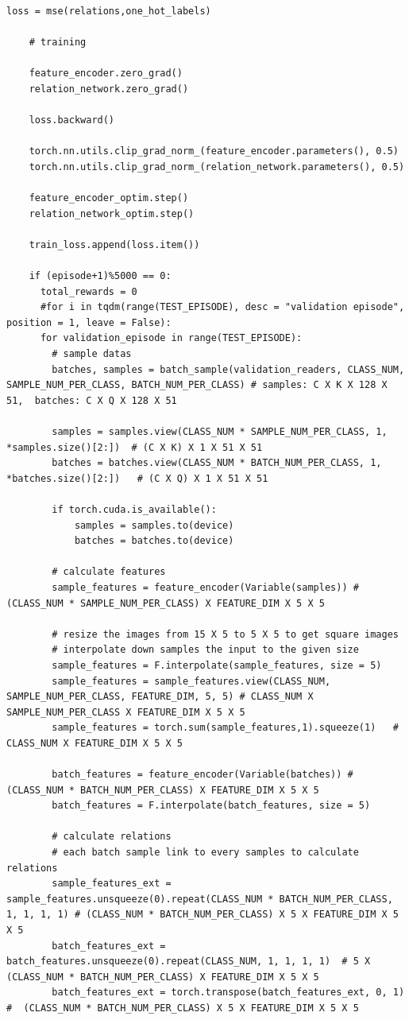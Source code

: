 \documentclass[12pt,a4paper,titlepage]{article}
\begin{document}
\begin{lstlisting}[language=iPython,firstnumber=1, caption=relation\_training.py, label=relation training,captionpos=b]
    loss = mse(relations,one_hot_labels)

    # training

    feature_encoder.zero_grad()
    relation_network.zero_grad()

    loss.backward()

    torch.nn.utils.clip_grad_norm_(feature_encoder.parameters(), 0.5)
    torch.nn.utils.clip_grad_norm_(relation_network.parameters(), 0.5)

    feature_encoder_optim.step()
    relation_network_optim.step()

    train_loss.append(loss.item())

    if (episode+1)%5000 == 0:
      total_rewards = 0
      #for i in tqdm(range(TEST_EPISODE), desc = "validation episode", position = 1, leave = False):
      for validation_episode in range(TEST_EPISODE):
        # sample datas
        batches, samples = batch_sample(validation_readers, CLASS_NUM, SAMPLE_NUM_PER_CLASS, BATCH_NUM_PER_CLASS) # samples: C X K X 128 X 51,  batches: C X Q X 128 X 51
        
        samples = samples.view(CLASS_NUM * SAMPLE_NUM_PER_CLASS, 1, *samples.size()[2:])  # (C X K) X 1 X 51 X 51
        batches = batches.view(CLASS_NUM * BATCH_NUM_PER_CLASS, 1, *batches.size()[2:])   # (C X Q) X 1 X 51 X 51

        if torch.cuda.is_available():
            samples = samples.to(device)
            batches = batches.to(device)

        # calculate features
        sample_features = feature_encoder(Variable(samples)) # (CLASS_NUM * SAMPLE_NUM_PER_CLASS) X FEATURE_DIM X 5 X 5

        # resize the images from 15 X 5 to 5 X 5 to get square images
        # interpolate down samples the input to the given size
        sample_features = F.interpolate(sample_features, size = 5)
        sample_features = sample_features.view(CLASS_NUM, SAMPLE_NUM_PER_CLASS, FEATURE_DIM, 5, 5) # CLASS_NUM X SAMPLE_NUM_PER_CLASS X FEATURE_DIM X 5 X 5
        sample_features = torch.sum(sample_features,1).squeeze(1)   # CLASS_NUM X FEATURE_DIM X 5 X 5

        batch_features = feature_encoder(Variable(batches)) # (CLASS_NUM * BATCH_NUM_PER_CLASS) X FEATURE_DIM X 5 X 5
        batch_features = F.interpolate(batch_features, size = 5)

        # calculate relations
        # each batch sample link to every samples to calculate relations
        sample_features_ext = sample_features.unsqueeze(0).repeat(CLASS_NUM * BATCH_NUM_PER_CLASS, 1, 1, 1, 1) # (CLASS_NUM * BATCH_NUM_PER_CLASS) X 5 X FEATURE_DIM X 5 X 5
        batch_features_ext = batch_features.unsqueeze(0).repeat(CLASS_NUM, 1, 1, 1, 1)  # 5 X (CLASS_NUM * BATCH_NUM_PER_CLASS) X FEATURE_DIM X 5 X 5
        batch_features_ext = torch.transpose(batch_features_ext, 0, 1)  #  (CLASS_NUM * BATCH_NUM_PER_CLASS) X 5 X FEATURE_DIM X 5 X 5


\end{lstlisting}
\end{document}
